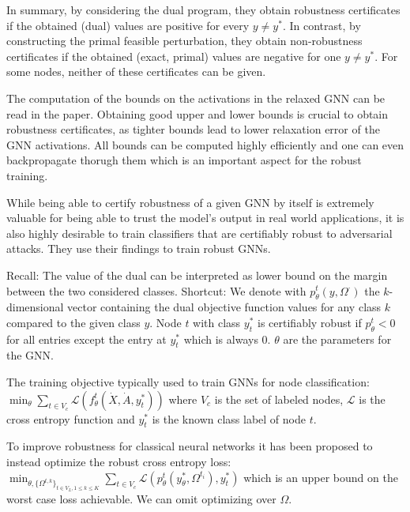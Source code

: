 \documentclass[a4paper,preprint]{sig-alternate}
\begin{document}
In summary, by considering the dual program, they obtain robustness certificates if the obtained (dual) values are positive for every $y \neq y^*$.
In contrast, by constructing the primal feasible perturbation, they obtain non-robustness certificates if the obtained (exact, primal) values
are negative for one $y \neq y^*$. For some nodes, neither of these certificates can be given.

The computation of the bounds on the activations in the relaxed GNN can be read in the paper. Obtaining good upper and lower bounds is crucial
to obtain robustness certificates, as tighter bounds lead to lower relaxation error of the GNN activations. 
All bounds can be computed highly efficiently and one can even backpropagate thorugh them which is an important aspect for the robust training.

While being able to certify robustness of a given GNN by itself is extremely valuable for being able to trust the model's output in real world
applications, it is also highly desirable to train classifiers that are certifiably robust to adversarial attacks.
They use their findings to train robust GNNs.\newline

Recall: The value of the dual can be interpreted as lower bound on the margin between the two considered classes.\newline
Shortcut: We denote with $p_{\theta}^t (y, \Omega^{\cdot})$ the $k$-dimensional vector containing the dual objective function values
for any class $k$ compared to the given class $y$. Node $t$ with class $y_t^{\ast}$ is certifiably robust if $p_{\theta}^t < 0$ for all entries
except the entry at $y_t^{\ast}$ which is always $0$. $\theta$ are the parameters for the GNN.\newline

The training objective typically used to train GNNs for node classification:\newline
$\min_{\theta} \sum_{t \in V_c} \mathcal{L} (f_{\theta}^t (\dot{X}, \dot{A}, y_t^{\ast}))$ where $V_c$ is the set of labeled nodes, $\mathcal{L}$ is the
cross entropy function and $y_t^{\ast}$ is the known class label of node $t$.\newline

To improve robustness for classical neural networks it has been proposed to instead optimize the robust cross entropy loss:\newline
$\min_{\theta, \{\Omega^{t, k}\}_{t \in V_L, 1 \leq k \leq K}} \sum_{t \in V_c} \mathcal{L} (p_{\theta}^t (y_{\theta}^{\ast}, \Omega^{t_i}), y_t^{\ast})$
which is an upper bound on the worst case loss achievable. We can omit optimizing over $\Omega$.\newline
\end{document}
